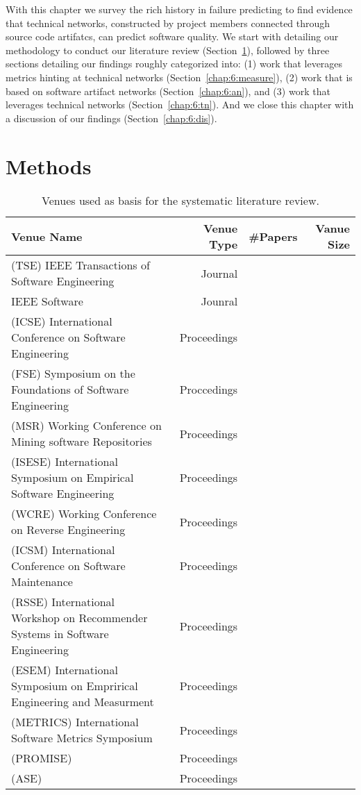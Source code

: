 \label{chap:tech-net}
With this chapter we survey the rich history in failure predicting to find evidence that technical networks, constructed by project members connected through source code artifatcs, can predict software quality.
We start with detailing our methodology to conduct our literature review (Section~\ref{chap:6:methods}), followed by three sections detailing our findings roughly categorized into: 
(1) work that leverages metrics hinting at technical networks (Section~\ref{chap:6:measure}),
(2) work that is based on software artifact networks (Section~\ref{chap:6:an}),
and (3) work that leverages technical networks (Section~\ref{chap:6:tn}).
And we close this chapter with a discussion of our findings (Section~\ref{chap:6:dis}).

\section{Methods}
\label{chap:6:methods}
\begin{table}[t]
\centering
\begin{tabular}{lrrr}
\toprule
Venue Name & Venue Type & \#Papers & Vanue Size\\
\midrule
(TSE) IEEE Transactions of Software Engineering & Journal &\\
IEEE Software & Jounral & \\
(ICSE) International Conference on Software Engineering & Proceedings & \\
(FSE) Symposium on the Foundations of Software Engineering & Proccedings & \\
(MSR) Working Conference on Mining software Repositories & Proceedings & \\
(ISESE) International Symposium on Empirical Software Engineering & Proceedings & \\
(WCRE) Working Conference on Reverse Engineering & Proceedings & \\
(ICSM) International Conference on Software Maintenance & Proceedings & \\
(RSSE) International Workshop on Recommender Systems in Software Engineering & Proceedings & \\
(ESEM) International Symposium on Emprirical Engineering and Measurment & Proceedings & \\
(METRICS) International Software Metrics Symposium & Proceedings & \\
(PROMISE) & Proceedings & \\
(ASE) & Proceedings & \\
\bottomrule
\end{tabular}
\label{chap:6:tab:venues}
\caption{Venues used as basis for the systematic literature review.}
\end{table}

